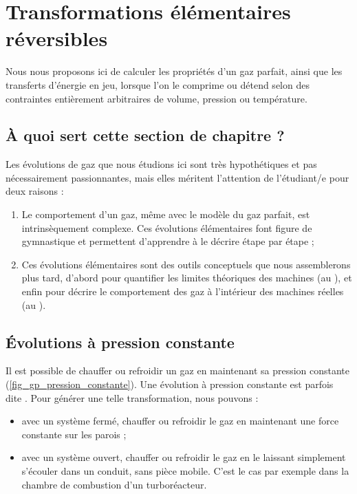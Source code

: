 \section{Transformations élémentaires réversibles}
\label{ch_gp_evolutions_elementaires}

	Nous nous proposons ici de calculer les propriétés d’un gaz parfait, ainsi que les transferts d’énergie en jeu, lorsque l’on le comprime ou détend selon des contraintes entièrement arbitraires de volume, pression ou température.


	\subsection{À quoi sert cette section de chapitre ?}
	\label{ch_gp_evolutions_elementaires_aquoisert}

		Les évolutions de gaz que nous étudions ici sont très hypothétiques et pas nécessairement passionnantes, mais elles méritent l’attention de l’étudiant/e pour deux raisons :

		\begin{enumerate}
			\item Le comportement d’un gaz, même avec le modèle du gaz parfait, est intrinsèquement complexe. Ces évolutions élémentaires font figure de gymnastique et permettent d’apprendre à le décrire étape par étape ;
			\item Ces évolutions élémentaires sont des outils conceptuels que nous assemblerons plus tard, d’abord pour quantifier les limites théoriques des machines (au \coursseptshort), et enfin pour décrire le comportement des gaz à l’intérieur des machines réelles (au \coursdixshort).
		\end{enumerate}


	\subsection{Évolutions à pression constante}
	\label{ch_gp_isobares}

		Il est possible de chauffer ou refroidir un gaz en maintenant sa pression constante (\cref{fig_gp_pression_constante}). Une évolution à pression constante est parfois dite . Pour générer une telle transformation, nous pouvons :
		
		\begin{itemize}
			\item avec un système fermé, chauffer ou refroidir le gaz en maintenant une force constante sur les parois ;
			\item avec un système ouvert, chauffer ou refroidir le gaz en le laissant simplement s’écouler dans un conduit, sans pièce mobile. C’est le cas par exemple dans la chambre de combustion d’un turboréacteur.
		\end{itemize}

